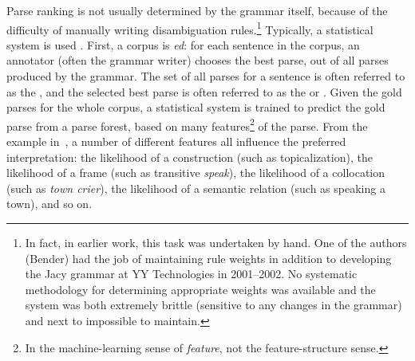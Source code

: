 \documentclass[output=paper
 	        ,biblatex
                ,babelshorthands
                ,newtxmath
                ,draftmode
                ,colorlinks, citecolor=brown
]{langscibook}
\begin{document}
\largerpage
Parse ranking is not usually determined by the grammar itself, because
of the difficulty of manually writing disambiguation
rules.\footnote{In fact, in earlier work, this task was undertaken by
  hand. One of the authors (Bender) had the job of maintaining rule
  weights in addition to developing the Jacy grammar \citep*{SBB2016a}
  at YY Technologies in 2001--2002. No systematic methodology for
  determining appropriate weights was available and the system was
  both extremely brittle (sensitive to any changes in the grammar) and
  next to impossible to maintain.}
Typically, a statistical system is used \citep{Tou:Man:Shi:Fli:Oep:02,Tou:Man:Fli:Oep:05}.
First, a corpus is \textit{ed}:
for each sentence in the corpus,
an annotator (often the grammar writer) chooses the best parse,
out of all parses produced by the grammar.
The set of all parses for a sentence is often referred to as the \textit{},
and the selected best parse is often referred to as the \textit{} or \textit{}.
Given the gold parses for the whole corpus, a statistical system is trained
to predict the gold parse from a parse forest,
based on many features\footnote{%
	In the machine-learning sense of \textit{feature},
	not the feature-structure sense.
}
of the parse.
From the example in~,
a number of different features all influence the preferred interpretation:
the likelihood of a construction (such as topicalization),
the likelihood of a  frame (such as transitive \textit{speak}),
the likelihood of a collocation (such as \textit{town crier}),
the likelihood of a semantic relation (such as speaking a town),
and so on.
\end{document}
